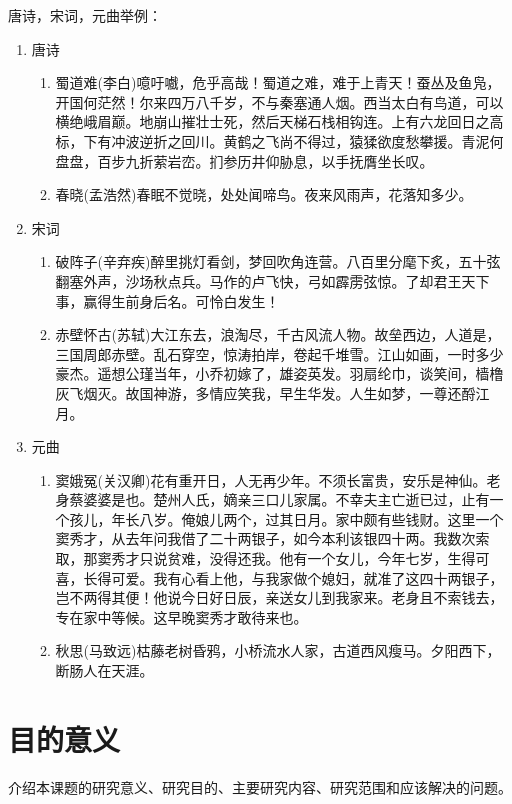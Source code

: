 唐诗，宋词，元曲举例：
\begin{enumerate}
	\item 唐诗
	\begin{enumerate} 
		\item 蜀道难(李白)噫吁嚱，危乎高哉！蜀道之难，难于上青天！蚕丛及鱼凫，开国何茫然！尔来四万八千岁，不与秦塞通人烟。西当太白有鸟道，可以横绝峨眉巅。地崩山摧壮士死，然后天梯石栈相钩连。上有六龙回日之高标，下有冲波逆折之回川。黄鹤之飞尚不得过，猿猱欲度愁攀援。青泥何盘盘，百步九折萦岩峦。扪参历井仰胁息，以手抚膺坐长叹。
		\item 春晓(孟浩然)春眠不觉晓，处处闻啼鸟。夜来风雨声，花落知多少。
	\end{enumerate}
	\item 宋词
	\begin{enumerate}
		\item 破阵子(辛弃疾)醉里挑灯看剑，梦回吹角连营。八百里分麾下炙，五十弦翻塞外声，沙场秋点兵。马作的卢飞快，弓如霹雳弦惊。了却君王天下事，赢得生前身后名。可怜白发生！
		\item 赤壁怀古(苏轼)大江东去，浪淘尽，千古风流人物。故垒西边，人道是，三国周郎赤壁。乱石穿空，惊涛拍岸，卷起千堆雪。江山如画，一时多少豪杰。遥想公瑾当年，小乔初嫁了，雄姿英发。羽扇纶巾，谈笑间，樯橹灰飞烟灭。故国神游，多情应笑我，早生华发。人生如梦，一尊还酹江月。
	\end{enumerate}
	\item 元曲
	\begin{enumerate}
		\item 窦娥冤(关汉卿)花有重开日，人无再少年。不须长富贵，安乐是神仙。老身蔡婆婆是也。楚州人氏，嫡亲三口儿家属。不幸夫主亡逝已过，止有一个孩儿，年长八岁。俺娘儿两个，过其日月。家中颇有些钱财。这里一个窦秀才，从去年问我借了二十两银子，如今本利该银四十两。我数次索取，那窦秀才只说贫难，没得还我。他有一个女儿，今年七岁，生得可喜，长得可爱。我有心看上他，与我家做个媳妇，就准了这四十两银子，岂不两得其便！他说今日好日辰，亲送女儿到我家来。老身且不索钱去，专在家中等候。这早晚窦秀才敢待来也。
		\item 秋思(马致远)枯藤老树昏鸦，小桥流水人家，古道西风瘦马。夕阳西下，断肠人在天涯。
	\end{enumerate}
\end{enumerate}

\section{目的意义}\label{sec:meaningful}
介绍本课题的研究意义、研究目的、主要研究内容、研究范围和应该解决的问题。

